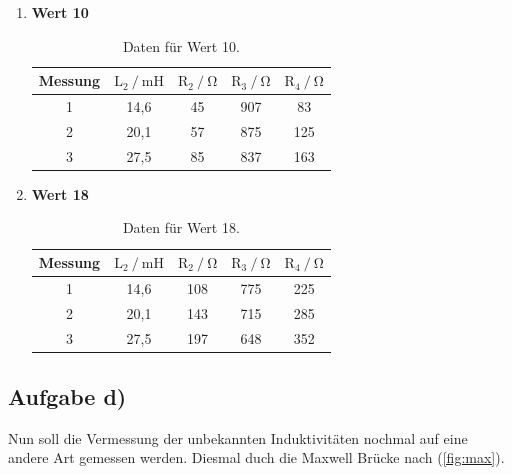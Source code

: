 \begin{enumerate}
\item \textbf{Wert 10}

\begin{table}
\centering
\begin{tabular}{c c c c c}
\toprule
{Messung} & {$\text{L}_2 \mathbin{/} \si{\milli\henry}$} &{$ \text{R}_2 \mathbin{/} \si{\ohm} $} & {$ \text{R}_3 \mathbin{/} \si{\ohm} $} & {$ \text{R}_4 \mathbin{/} \si{\ohm} $} \\
\midrule
1 & 14,6 & 45 & 907 & 83 \\
2 & 20,1 & 57 & 875 & 125 \\
3 & 27,5 & 85 & 837 & 163 \\
\bottomrule
\end{tabular}
\caption{Daten für Wert 10.}
\label{tab:ac10}
\end{table}



\item \textbf{Wert 18}

\begin{table}
\centering
\begin{tabular}{c c c c c}
\toprule
{Messung} & {$\text{L}_2 \mathbin{/} \si{\milli\henry}$} &{$ \text{R}_2 \mathbin{/} \si{\ohm} $} & {$ \text{R}_3 \mathbin{/} \si{\ohm} $} & {$ \text{R}_4 \mathbin{/} \si{\ohm} $} \\
\midrule
1 & 14,6 & 108 & 775 & 225 \\
2 & 20,1 & 143 & 715 & 285 \\
3 & 27,5 & 197 & 648 & 352 \\
\bottomrule
\end{tabular}
\caption{Daten für Wert 18.}
\label{tab:ac18}
\end{table}

\end{enumerate}

\newpage
\subsection{Aufgabe d)}

Nun soll die Vermessung der unbekannten Induktivitäten nochmal auf eine andere Art gemessen werden.
Diesmal duch die Maxwell Brücke nach (\ref{fig:max}). 

